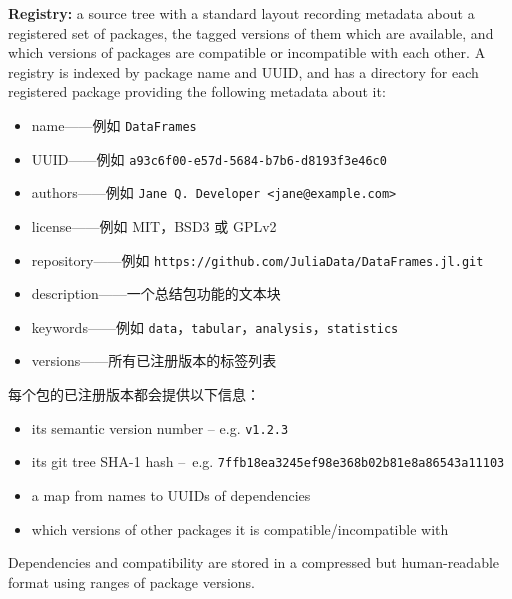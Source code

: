 \textbf{Registry:} a source tree with a standard layout recording metadata about a registered set of packages, the tagged versions of them which are available, and which versions of packages are compatible or incompatible with each other. A registry is indexed by package name and UUID, and has a directory for each registered package providing the following metadata about it:



\begin{itemize}
\item name——例如 \texttt{DataFrames}


\item UUID——例如 \texttt{a93c6f00-e57d-5684-b7b6-d8193f3e46c0}


\item authors——例如 \texttt{Jane Q. Developer <jane@example.com>}


\item license——例如 MIT，BSD3 或 GPLv2


\item repository——例如 \texttt{https://github.com/JuliaData/DataFrames.jl.git}


\item description——一个总结包功能的文本块


\item keywords——例如 \texttt{data}，\texttt{tabular}，\texttt{analysis}，\texttt{statistics}


\item versions——所有已注册版本的标签列表

\end{itemize}


每个包的已注册版本都会提供以下信息：



\begin{itemize}
\item its semantic version number – e.g. \texttt{v1.2.3}


\item its git tree SHA-1 hash – e.g. \texttt{7ffb18ea3245ef98e368b02b81e8a86543a11103}


\item a map from names to UUIDs of dependencies


\item which versions of other packages it is compatible/incompatible with

\end{itemize}


Dependencies and compatibility are stored in a compressed but human-readable format using ranges of package versions.



